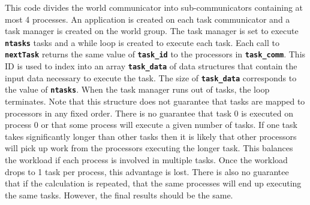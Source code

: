 This code divides the world communicator into sub-communicators containing at
most 4 processes. An application is created on each task communicator and a task
manager is created on the world group. The task manager is set to execute
\texttt{\textbf{ntasks}} tasks and a while loop is created to execute each task.
Each call to \texttt{\textbf{nextTask}} returns the same value of
\texttt{\textbf{task\_id}} to the processors in \texttt{\textbf{task\_comm}}.
This ID is used to index into an array \texttt{\textbf{task\_data}} of data
structures that contain the input data necessary to execute the task. The size
of \texttt{\textbf{task\_data}} corresponds to the value of
\texttt{\textbf{ntasks}}. When the task manager runs out of tasks, the loop
terminates. Note that this structure does not guarantee that tasks are mapped to
processors in any fixed order. There is no guarantee that task 0 is executed on
process 0 or that some process will execute a given number of tasks. If one task
takes significantly longer than other tasks then it is likely that other
processors will pick up work from the processors executing the longer task. This
balances the workload if each process is involved in multiple tasks. Once the
workload drops to 1 task per process, this advantage is lost. There is also no
guarantee that if the calculation is repeated, that the same processes will end
up executing the same tasks. However, the final results should be the same.
